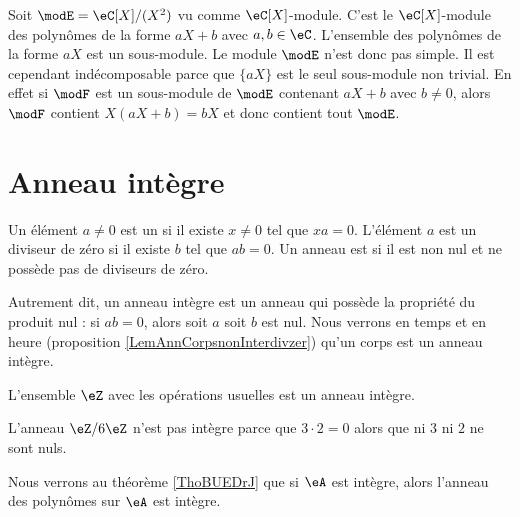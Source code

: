 \begin{example}
    Soit \( \modE=\eC[X]/(X^2)\) vu comme \( \eC[X]\)-module. C'est le \( \eC[X]\)-module des polynômes de la forme \( aX+b\) avec \( a,b\in \eC\). L'ensemble des polynômes de la forme \( aX\) est un sous-module. Le module \( \modE\) n'est donc pas simple. Il est cependant indécomposable parce que \( \{ aX \}\) est le seul sous-module non trivial. En effet si \( \modF\) est un sous-module de \( \modE\) contenant \( aX+b\) avec \( b\neq 0\), alors \( \modF\) contient \( X(aX+b)=bX\) et donc contient tout \( \modE\).
\end{example}

\section{Anneau intègre}

Un élément \( a\neq 0\) est un  si il existe \( x\neq 0\) tel que $xa=0$. L'élément \( a\) est un diviseur de zéro  si il existe \( b\) tel que \( ab=0\). Un anneau est  si il est non nul et ne possède pas de diviseurs de zéro.

Autrement dit, un anneau intègre est un anneau qui possède la propriété du produit nul : si \( ab=0\), alors soit \( a\) soit \( b\) est nul. Nous verrons en temps et en heure (proposition \ref{LemAnnCorpsnonInterdivzer}) qu'un corps est un anneau intègre.

\begin{example}
    L'ensemble \( \eZ\) avec les opérations usuelles est un anneau intègre.
\end{example}

\begin{example}
    L'anneau \( \eZ/6\eZ\) n'est pas intègre parce que \( 3\cdot 2=0\) alors que ni \( 3\) ni \( 2\) ne sont nuls.
\end{example}

\begin{example}
    Nous verrons au théorème \ref{ThoBUEDrJ} que si \( \eA\) est intègre, alors l'anneau des polynômes sur \( \eA\) est intègre.
\end{example}

